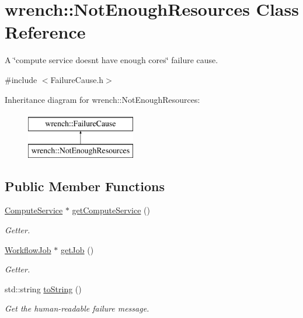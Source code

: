 \hypertarget{classwrench_1_1_not_enough_resources}{}\section{wrench\+:\+:Not\+Enough\+Resources Class Reference}
\label{classwrench_1_1_not_enough_resources}


A \char`\"{}compute service doesn\textquotesingle{}t have enough cores\char`\"{} failure cause.  




{\ttfamily \#include $<$Failure\+Cause.\+h$>$}

Inheritance diagram for wrench\+:\+:Not\+Enough\+Resources\+:\begin{figure}[H]
\begin{center}
\leavevmode
\includegraphics[height=2.000000cm]{classwrench_1_1_not_enough_resources}
\end{center}
\end{figure}
\subsection*{Public Member Functions}
\begin{DoxyCompactItemize}
\item 
\hyperlink{classwrench_1_1_compute_service}{Compute\+Service} $\ast$ \hyperlink{classwrench_1_1_not_enough_resources_a2ded283721b584804b1220b2db4548b3}{get\+Compute\+Service} ()
\begin{DoxyCompactList}\small\item\em Getter. \end{DoxyCompactList}\item 
\hyperlink{classwrench_1_1_workflow_job}{Workflow\+Job} $\ast$ \hyperlink{classwrench_1_1_not_enough_resources_a8bf50edc9be82619b404ae82a9288f94}{get\+Job} ()
\begin{DoxyCompactList}\small\item\em Getter. \end{DoxyCompactList}\item 
std\+::string \hyperlink{classwrench_1_1_not_enough_resources_aeccad36aeccb259ac4c2d17752963269}{to\+String} ()
\begin{DoxyCompactList}\small\item\em Get the human-\/readable failure message. \end{DoxyCompactList}\end{DoxyCompactItemize}
